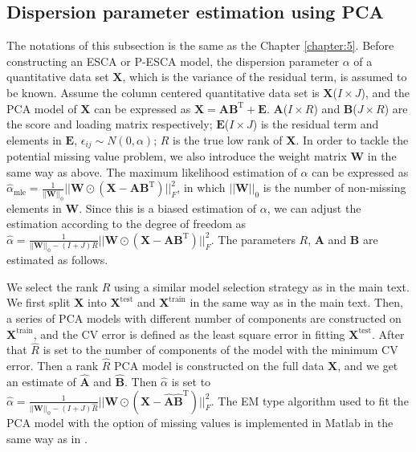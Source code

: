 \subsection{Dispersion parameter estimation using PCA}
The notations of this subsection is the same as the Chapter \ref{chapter:5}. Before constructing an ESCA or P-ESCA model, the dispersion parameter $\alpha$ of a quantitative data set $\mathbf{X}$, which is the variance of the residual term, is assumed to be known. Assume the column centered quantitative data set is $\mathbf{X}$($I \times J$), and the PCA model of $\mathbf{X}$ can be expressed as $\mathbf{X} = \mathbf{AB}^{\text{T}} + \mathbf{E}$. $\mathbf{A}$($I \times R$) and $\mathbf{B}$($J \times R$) are the score and loading matrix respectively; $\mathbf{E}$($I \times J$) is the residual term and elements in $\mathbf{E}$, $\epsilon_{ij} \sim N(0,\alpha)$; $R$ is the true low rank of $\mathbf{X}$. In order to tackle the potential missing value problem, we also introduce the weight matrix $\mathbf{W}$ in the same way as above. The maximum likelihood estimation of $\alpha$ can be expressed as $\hat{\alpha}_{\text{mle}} = \frac{1}{||\mathbf{W}||_0} ||\mathbf{W} \odot (\mathbf{X} - \mathbf{AB}^{\text{T}})||_{F}^2$, in which $||\mathbf{W}||_0$ is the number of non-missing elements in $\mathbf{W}$. Since this is a biased estimation of $\alpha$, we can adjust the estimation according to the degree of freedom as $\hat{\alpha} = \frac{1}{||\mathbf{W}||_0 - (I+J)R} ||\mathbf{W} \odot (\mathbf{X} - \mathbf{AB}^{\text{T}})||_{F}^2$. The parameters $R$, $\mathbf{A}$ and $\mathbf{B}$ are estimated as follows.

We select the rank $R$ using a similar model selection strategy as in the main text. We first split $\mathbf{X}$ into $\mathbf{X}^{\text{test}}$ and $\mathbf{X}^{\text{train}}$ in the same way as in the main text. Then, a series of PCA models with different number of components are constructed on $\mathbf{X}^{\text{train}}$, and the CV error is defined as the least square error in fitting $\mathbf{X}^{\text{test}}$. After that $\hat{R}$ is set to the number of components of the model with the minimum CV error. Then a rank $\hat{R}$ PCA model is constructed on the full data $\mathbf{X}$, and we get an estimate of $\hat{\mathbf{A}}$ and $\hat{\mathbf{B}}$. Then $\hat{\alpha}$ is set to $\hat{\alpha} = \frac{1}{||\mathbf{W}||_0 - (I+J)\hat{R}} ||\mathbf{W} \odot (\mathbf{X} - \hat{\mathbf{A}}\hat{\mathbf{B}}^{\text{T}})||_{F}^2$. The EM type algorithm used to fit the PCA model with the option of missing values is implemented in Matlab in the same way as in \cite{kiers1997weighted}.



